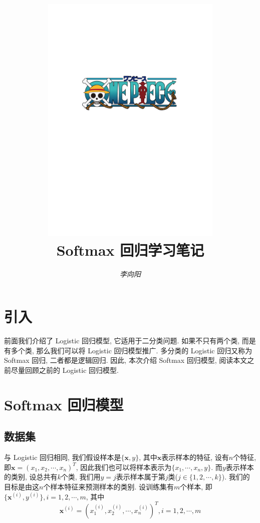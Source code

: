 \documentclass[a4paper,UTF8]{ctexart}
\theoremstyle{plain} \newtheorem{theorem}{定理}[section]
\theoremstyle{plain} \newtheorem{definition}{定义}[section]
\theoremstyle{plain} \newtheorem{lemma}{引理}[section]
\theoremstyle{plain} \newtheorem{proposition}{命题}[section]
\theoremstyle{plain} \newtheorem{example}{例}[section]
\theoremstyle{plain} \newtheorem{remark}{注}[section]
\theoremstyle{plain} \newtheorem{corollary}{推论}[section]
\begin{document}
\title{
\includegraphics[width=0.65\textwidth]{onepiece.pdf}\\
\vspace{2em}
\textbf{Softmax 回归学习笔记}}
\author{\emph{李向阳}  }
\date{}


\maketitle
\thispagestyle{empty}

\newpage


\tableofcontents

\newpage

\section{引入}
前面我们介绍了 Logistic 回归模型, 它适用于二分类问题. 如果不只有两个类, 而是有多个类, 那么我们可以将 Logistic 回归模型推广. 多分类的 Logistic 回归又称为 Softmax 回归, 二者都是逻辑回归. 因此, 本次介绍 Softmax 回归模型, 阅读本文之前尽量回顾之前的 Logistic 回归模型.


\section{Softmax 回归模型}

\subsection{数据集}
与 Logistic 回归相同, 我们假设样本是$\{\bm{x}, y\}$, 其中$\bm{x}$表示样本的特征, 设有$n$个特征, 即$\bm{x} = (x_{1}, x_{2}, \cdots, x_{n})^{T}$, 因此我们也可以将样本表示为$\{x_{1}, \cdots, x_{n}, y\}$. 而$y$表示样本的类别, 设总共有$k$个类, 我们用$y = j$表示样本属于第$j$类($j \in \{1, 2, \cdots, k\}$). 我们的目标是由这$n$个样本特征来预测样本的类别. 设训练集有$m$个样本, 即$\{\bm{x}^{(i)}, y^{(i)}\}, i=1,2,\cdots,m$, 其中
\begin{equation*}
\bm{x}^{(i)} = (x_{1}^{(i)},x_{2}^{(i)},\cdots,x_{n}^{(i)})^{T},i = 1,2,\cdots,m
\end{equation*}
\end{document}

